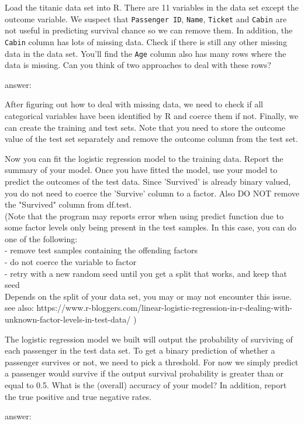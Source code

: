 \documentclass{article}
\newcommand{\answerbox}[1]{
	\begin{center}
		\ifdefined\printsol
			\begin{mdframed}
				\begin{minipage}{0.95\textwidth}
					{\color{blue} {#1}}
				\end{minipage}
			\end{mdframed}
		\else
			\begin{mdframed}
				\begin{minipage}{0.95\textwidth}
					\phantom{\parbox{\linewidth}{#1}}
				\end{minipage}
			\end{mdframed}
		\fi
		\end{center}
	}
\begin{document}
\bigskip

Load the titanic data set into R. There are 11 variables in the data set
except the outcome variable. We suspect that {\tt Passenger ID}, {\tt Name},
{\tt Ticket} and {\tt Cabin} are not useful in predicting survival chance
so we can remove them. In addition, the {\tt Cabin} column has lots of missing
data. Check if there is still any other missing data in the data set.
You'll find the {\tt Age} column also has many rows where the data is missing.
Can you think of two approaches to deal with these rows?

\answerbox{
answer:
}

\bigskip

After figuring out how to deal with missing data, we need to check if
all categorical variables have been identified by R and coerce them if
not. Finally, we can create the training and test sets. Note that you
need to store the outcome value of the test set separately and remove
the outcome column from the test set.

Now you can fit the logistic regression model to the training data. Report the
summary of your model. Once you have fitted the model, use your model to
predict the outcomes of the test data. Since 'Survived' is already binary valued, you do not need to coerce the 'Survive' column to a factor. Also DO NOT remove the "Survived" column from df.test. \\(Note that the program may reports error when using predict function due to some factor levels only being present in the test samples. In this case, you can do one of the following:\\
- remove test samples containing the offending factors\\
- do not coerce the variable to factor\\
- retry with a new random seed until you get a split that works, and keep that seed\\Depends on the split of your data set, you may or may not encounter this issue. see also: https://www.r-bloggers.com/linear-logistic-regression-in-r-dealing-with-unknown-factor-levels-in-test-data/ )

\bigskip

The logistic regression model we built will output the probability of
surviving of each passenger in the test data set. To get a binary
prediction of whether a passenger survives or not, we need to pick a
threshold. For now we simply predict a passenger would survive if the
output survival probability is greater than or equal to 0.5. What is the (overall) accuracy of your model?
In addition, report the true positive and true negative rates.
\answerbox{
  answer:
}
\end{document}
